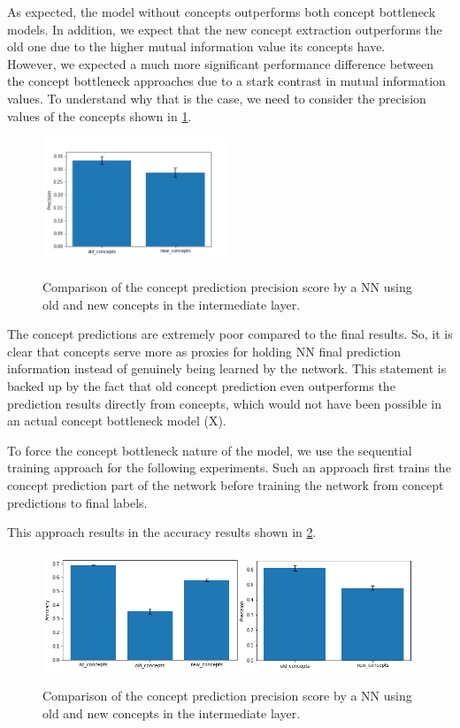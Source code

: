 As expected, the model without concepts outperforms both concept bottleneck models. 
In addition, we expect that the new concept extraction outperforms the old one due to the higher mutual information value its concepts have. \\
However, we expected a much more significant performance difference between the concept bottleneck approaches due to a stark contrast in mutual information values.
To understand why that is the case, we need to consider the precision values of the concepts shown in \ref{full-process-concept-precision}.

\begin{figure}[h]
\caption{Comparison of the concept prediction precision score by a NN using old and new concepts in the intermediate layer.}
\centering
\includegraphics[width=0.5\textwidth]{concept-bottleneck-pipeline/concept_precisions.png}
\label{full-process-concept-precision}
\end{figure}

The concept predictions are extremely poor compared to the final results.
So, it is clear that concepts serve more as proxies for holding NN final prediction information instead of genuinely being learned by the network.
This statement is backed up by the fact that old concept prediction even outperforms the prediction results directly from concepts, which would not have been possible in an actual concept bottleneck model (X).

To force the concept bottleneck nature of the model, we use the sequential training approach for the following experiments.
Such an approach first trains the concept prediction part of the network before training the network from concept predictions to final labels.

This approach results in the accuracy results shown in \ref{seq-full-model-results}.

\begin{figure}[h]
\caption{Comparison of the concept prediction precision score by a NN using old and new concepts in the intermediate layer.}
\centering
\includegraphics[width=\textwidth]{concept-bottleneck-pipeline/seq_comparison.png}
\label{seq-full-model-results}
\end{figure}

